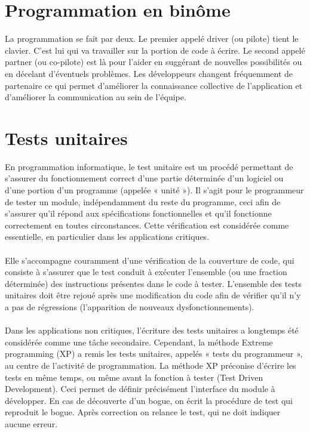 \section{Programmation en binôme}\label{lexique:pairProgramming}
La programmation se fait par deux. Le premier appelé driver (ou pilote) tient le clavier. C'est lui qui va travailler sur la portion de code à écrire. Le second appelé partner (ou co-pilote) est là pour l'aider en suggérant de nouvelles possibilités ou en décelant d'éventuels problèmes. Les développeurs changent fréquemment de partenaire ce qui permet d'améliorer la connaissance collective de l'application et d'améliorer la communication au sein de l'équipe. 

\section{Tests unitaires}\label{lexique:testU}
En programmation informatique, le test unitaire est un procédé permettant de s'assurer du fonctionnement correct d'une partie déterminée d'un logiciel ou d'une portion d'un programme (appelée « unité »). Il s'agit pour le programmeur de tester un module, indépendamment du reste du programme, ceci afin de s'assurer qu'il répond aux spécifications fonctionnelles et qu'il fonctionne correctement en toutes circonstances. Cette vérification est considérée comme essentielle, en particulier dans les applications critiques.
\paragraph*{}
Elle s'accompagne couramment d'une vérification de la couverture de code, qui consiste à s'assurer que le test conduit à exécuter l'ensemble (ou une fraction déterminée) des instructions présentes dans le code à tester. L'ensemble des tests unitaires doit être rejoué après une modification du code afin de vérifier qu'il n'y a pas de régressions (l'apparition de nouveaux dysfonctionnements). 
\paragraph*{}
Dans les applications non critiques, l'écriture des tests unitaires a longtemps été considérée comme une tâche secondaire. Cependant, la méthode Extreme programming (XP) a remis les tests unitaires, appelés « tests du programmeur », au centre de l'activité de programmation. La méthode XP préconise d'écrire les tests en même temps, ou même avant la fonction à tester (Test Driven Development). Ceci permet de définir précisément l'interface du module à développer. En cas de découverte d'un bogue, on écrit la procédure de test qui reproduit le bogue. Après correction on relance le test, qui ne doit indiquer aucune erreur.

